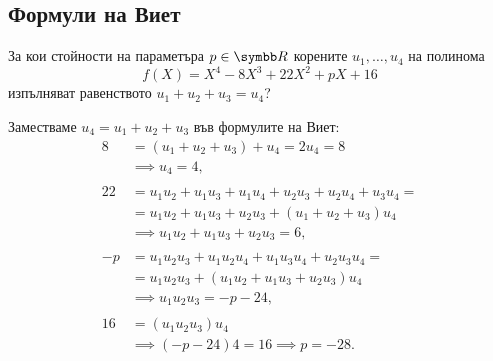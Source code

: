 \documentclass[numbers=endperiod, bibliography=totocnumbered]{scrartcl}
\begin{document}
\subsection{Формули на Виет}

\begin{exercise}
  За кои стойности на параметъра \( p \in \R \) корените \( u_1, \ldots, u_4 \) на полинома
  \begin{equation*}
    f(X) = X^4 - 8X^3 + 22X^2 + pX + 16
  \end{equation*}
  изпълняват равенството \( u_1 + u_2 + u_3 = u_4 \)?
\end{exercise}
\begin{solution}
  Заместваме \( u_4 = u_1 + u_2 + u_3 \) във формулите на Виет:
  \begin{align*}
    8 &= (u_1 + u_2 + u_3) + u_4 = 2u_4 = 8
    \\&\implies
    u_4 = 4,
    \\ \\
    22 &= u_1 u_2 + u_1 u_3 + u_1 u_4 + u_2 u_3 + u_2 u_4 + u_3 u_4 = \\ &= u_1 u_2 + u_1 u_3 + u_2 u_3 + (u_1 + u_2 + u_3) u_4
    \\&\implies
    u_1 u_2 + u_1 u_3 + u_2 u_3 = 6,
    \\ \\
    -p &= u_1 u_2 u_3 + u_1 u_2 u_4 + u_1 u_3 u_4 + u_2 u_3 u_4 = \\ &= u_1 u_2 u_3 + (u_1 u_2 + u_1 u_3 + u_2 u_3) u_4 \\&\implies
    u_1 u_2 u_3 = -p - 24,
    \\ \\
    16 &= (u_1 u_2 u_3) u_4
    \\&\implies
    (-p - 24) 4 = 16 \implies p = -28.
  \end{align*}
\end{solution}

\printbibliography
\end{document}
